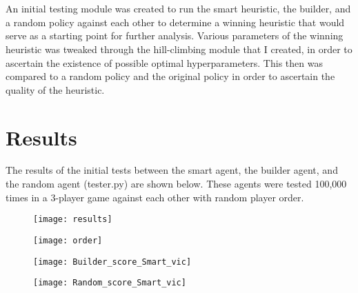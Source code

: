 \documentclass[a4paper, 11pt]{article}
\begin{document}
\\ \\
\noindent An initial testing module was created to run the smart heuristic, the builder, and a random policy against each other to determine a winning heuristic that would serve as a starting point for further analysis. Various parameters of the winning heuristic was tweaked through the hill-climbing module that I created, in order to ascertain the existence of possible optimal hyperparameters. This then was compared to a random policy and the original policy in order to ascertain the quality of the heuristic.

\section{Results}

The results of the initial tests between the smart agent, the builder agent, and the random agent (tester.py) are shown below. These agents were tested 100,000 times in a 3-player game against each other with random player order.

\begin{figure}
\centering
\begin{minipage}{.5\textwidth}
  \centering
  \texttt{[image: results]}
  \label{fig:test1}
\end{minipage}%
\begin{minipage}{.5\textwidth}
  \centering
  \texttt{[image: order]}
  \label{fig:test2}
\end{minipage}
\end{figure}

\begin{figure}
\centering
\begin{minipage}{.5\textwidth}
  \centering
  \texttt{[image: Builder\_score\_Smart\_vic]}
  \label{fig:test1}
\end{minipage}%
\begin{minipage}{.5\textwidth}
  \centering
  \texttt{[image: Random\_score\_Smart\_vic]}
  \label{fig:test2}
\end{minipage}
\end{figure}
\end{document}
